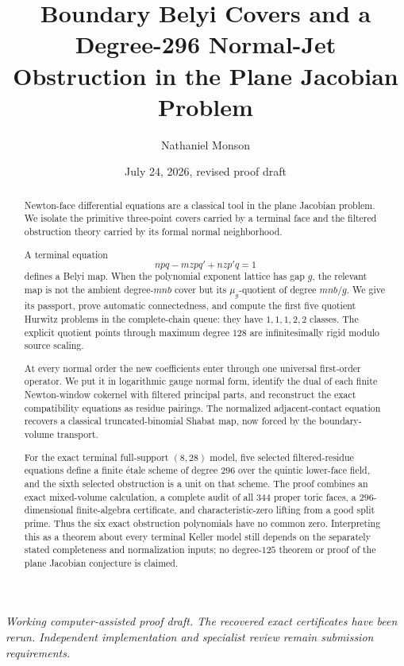 \documentclass[11pt,reqno]{amsart}
\title[Boundary Belyi covers and a degree-296 obstruction]{Boundary Belyi Covers and a Degree-296
Normal-Jet Obstruction in the Plane Jacobian Problem}
\author{Nathaniel Monson}
\date{July 24, 2026, revised proof draft}
\begin{document}
\begin{abstract}
Newton-face differential equations are a classical tool in the plane
Jacobian problem.  We isolate the primitive three-point covers carried by a
terminal face and the filtered obstruction theory carried by its formal
normal neighborhood.

A terminal equation
\[
 npq-mzpq'+nzp'q=1
\]
defines a Belyi map.  When the polynomial exponent lattice has gap \(g\),
the relevant map is not the ambient degree-\(mnb\) cover but its
\(\mu_g\)-quotient of degree \(mnb/g\).  We give its passport, prove
automatic connectedness, and compute the first five quotient Hurwitz
problems in the complete-chain queue: they have \(1,1,1,2,2\) classes.
The explicit quotient points through maximum degree \(128\) are
infinitesimally rigid modulo source scaling.

At every normal order the new coefficients enter through one universal
first-order operator.  We put it in logarithmic gauge normal form, identify
the dual of each finite Newton-window cokernel with filtered principal
parts, and reconstruct the exact compatibility equations as residue
pairings.  The normalized adjacent-contact equation recovers a classical
truncated-binomial Shabat map, now forced by the boundary-volume transport.

For the exact terminal full-support \((8,28)\) model, five selected
filtered-residue equations define a finite \'{e}tale scheme of degree \(296\)
over the quintic lower-face field, and the sixth selected obstruction is a
unit on that scheme.  The proof combines an exact mixed-volume calculation,
a complete audit of all \(344\) proper toric faces, a \(296\)-dimensional
finite-algebra certificate, and characteristic-zero lifting from a good
split prime.  Thus the six exact obstruction polynomials have no common
zero.  Interpreting this as a theorem about every terminal Keller model
still depends on the separately stated completeness and normalization
inputs; no degree-\(125\) theorem or proof of the plane Jacobian conjecture
is claimed.
\end{abstract}

\maketitle

\begin{center}
\small\emph{Working computer-assisted proof draft.  The recovered exact
certificates have been rerun.  Independent implementation and specialist
review remain submission requirements.}
\end{center}
\end{document}
